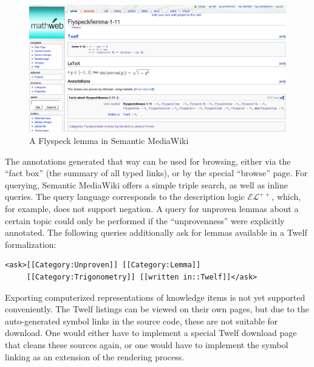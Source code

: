 \begin{figure}
  \centering
  \includegraphics[width=\textwidth]{images/smw-lemma}
  \caption[A Flyspeck lemma in Semantic MediaWiki]{A Flyspeck lemma in Semantic
    MediaWiki\protect\footnotemark}
  \label{fig:smw-lemma}
\end{figure}
\addtocounter{footnote}{-1}

The annotations generated that way can be used for browsing, either via the
``fact box'' (the summary of all typed links), or by the special ``browse''
page.  For querying, Semantic MediaWiki offers a simple triple search, as well
as inline queries.  The query language corresponds to the description logic
$\mathcal{EL}^{++}$\cite{KrSchVr:semwiki-reasoning07}, which, for example, does
not support negation.  A query for unproven lemmas about a certain topic could
only be performed if the ``unprovenness'' were explicitly annotated.  The
following queries additionally ask for lemmas available in a Twelf formalization:

\begin{lstlisting}
<ask>[[Category:Unproven]] [[Category:Lemma]]
     [[Category:Trigonometry]] [[written in::Twelf]]</ask>
\end{lstlisting}

Exporting computerized representations of knowledge items is not yet supported
conveniently.  The Twelf listings can be viewed on their own pages, but due to
the auto-generated symbol links in the source code, these are not suitable for
download.  One would either have to implement a special Twelf download page that
cleans these sources again, or one would have to implement the symbol linking as
an extension of the rendering process.


